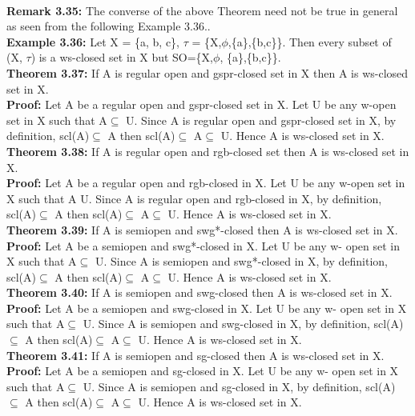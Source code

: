 {{{				\\\textbf{Remark 3.35:} The converse of the above Theorem need not be true in general as seen from the following Example 3.36..
				\\\textbf{Example 3.36:} Let X = \{a, b, c\},  $\tau$ = \{X,$\phi$,\{a\},\{b,c\}\}. Then every subset of (X, $\tau$) is a  ws-closed set in X but SO=\{X,$\phi$, \{a\},\{b,c\}\}.
				\\\textbf{Theorem 3.37:} If A is regular open and gspr-closed set in X then A is ws-closed set in X.
				\\\textbf{Proof:} Let A be a regular open and gspr-closed set  in X. Let U be any w-open set in X such that A$\subseteq$ U. Since A is regular open and gspr-closed set in X, by definition, scl(A)$\subseteq$ A then scl(A)$\subseteq$ A$\subseteq$ U. Hence A is  ws-closed set in X.
				\\\textbf{Theorem 3.38:} If A is regular open and rgb-closed set then A is ws-closed set in X.
				\\\textbf{Proof:} Let A be a regular open and rgb-closed in X. Let U be any w-open set in X such that A U. Since A is regular open and rgb-closed in X, by definition, scl(A)$\subseteq$ A then scl(A)$\subseteq$ A$\subseteq$ U. Hence A is ws-closed set in X.
				\\\textbf{Theorem 3.39:} If A is semiopen and swg*-closed then A is  ws-closed set in X.
				\\\textbf{Proof:} Let A be a semiopen and swg*-closed in X. Let U be any w- open set in X such that A$\subseteq$ U. Since A is semiopen and swg*-closed in X, by definition, scl(A)$\subseteq$ A then scl(A)$\subseteq$ A$\subseteq$ U. Hence A is  ws-closed set in X.
				\\\textbf{Theorem 3.40:} If A is semiopen and swg-closed then A is  ws-closed set in X.
				\\\textbf{Proof:} Let A be a semiopen and swg-closed in X. Let U be any w- open set in X such that A$\subseteq$ U. Since A is semiopen and swg-closed in X, by definition, scl(A)$\subseteq$ A then scl(A)$\subseteq$ A$\subseteq$ U. Hence A is  ws-closed set in X.
				\\\textbf{Theorem 3.41:} If A is semiopen and sg-closed then A is ws-closed set in X.
				\\\textbf{Proof:} Let A be a semiopen and sg-closed in X. Let U be any w- open set in X such that A$\subseteq$ U. Since A is semiopen and sg-closed in X, by definition, scl(A)$\subseteq$ A then scl(A)$\subseteq$ A$\subseteq$ U. Hence A is ws-closed set in X.
}}}
